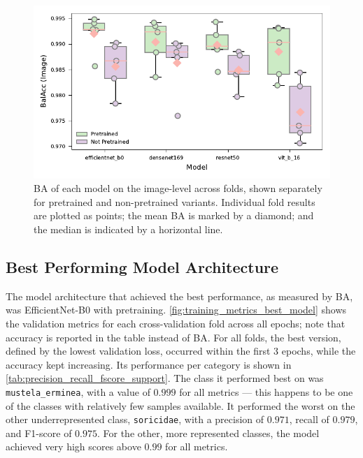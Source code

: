 \setlength{\fboxsep}{1pt}

\setlength{\fboxsep}{3pt}

\begin{figure}[ht]
\centering
\includegraphics{figures/bal_acc_img.pdf}
\caption{\acs{BA} of each model on the image-level across folds, shown separately for pretrained and non-pretrained variants. Individual fold results are plotted as points; the mean \acs{BA} is marked by a diamond; and the median is indicated by a horizontal line.}
\label{fig:bal_acc_img}
\end{figure}

\subsection{Best Performing Model Architecture}
The model architecture that achieved the best performance, as measured by \ac{BA}, was EfficientNet-B0 with pretraining. 
\autoref{fig:training_metrics_best_model} shows the validation metrics for each cross-validation fold across all epochs; note that accuracy is reported in the table instead of \ac{BA}.
For all folds, the best version, defined by the lowest validation loss, occurred within the first 3 epochs, while the accuracy kept increasing.
Its performance per category is shown in \autoref{tab:precision_recall_fscore_support}.
The class it performed best on was \texttt{mustela\_erminea}, with a value of \(0.999\) for all metrics --- this happens to be one of the classes with relatively few samples available.
It performed the worst on the other underrepresented class, \texttt{soricidae}, with a precision of \(0.971\), recall of \(0.979\), and F1-score of \(0.975\).
For the other, more represented classes, the model achieved very high scores above \(0.99\) for all metrics.

